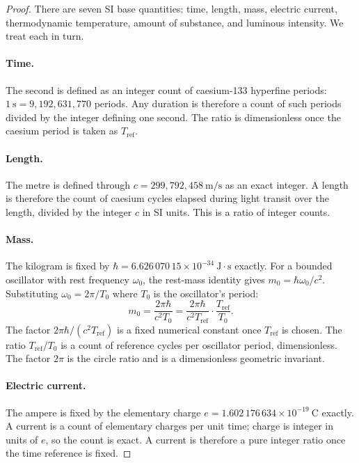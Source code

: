\begin{proof}
There are seven SI base quantities: time, length, mass, electric current,
thermodynamic temperature, amount of substance, and luminous intensity.
We treat each in turn.

\paragraph{Time.}
The second is defined as an integer count of caesium-133 hyperfine periods:
$1~\mathrm{s} = 9{,}192{,}631{,}770$ periods.
Any duration is therefore a count of such periods divided by the integer
defining one second.
The ratio is dimensionless once the caesium period is taken as $T_{\mathrm{ref}}$.

\paragraph{Length.}
The metre is defined through $c = 299{,}792{,}458~\mathrm{m/s}$ as an exact integer.
A length is therefore the count of caesium cycles elapsed during light
transit over the length, divided by the integer $c$ in SI units.
This is a ratio of integer counts.

\paragraph{Mass.}
The kilogram is fixed by $\hbar = 6.626\,070\,15\times10^{-34}~\mathrm{J\cdot s}$
exactly.
For a bounded oscillator with rest frequency $\omega_{0}$,
the rest-mass identity gives $m_{0} = \hbar\omega_{0}/c^{2}$.
Substituting $\omega_{0} = 2\pi/T_{0}$ where $T_{0}$ is the oscillator's period:
\begin{equation}
  m_{0} = \frac{2\pi\hbar}{c^{2}T_{0}}
        = \frac{2\pi\hbar}{c^{2}T_{\mathrm{ref}}} \cdot \frac{T_{\mathrm{ref}}}{T_{0}}.
\end{equation}
The factor $2\pi\hbar/(c^{2}T_{\mathrm{ref}})$ is a fixed numerical constant once
$T_{\mathrm{ref}}$ is chosen.
The ratio $T_{\mathrm{ref}}/T_{0}$ is a count of reference cycles per oscillator
period, dimensionless.
The factor $2\pi$ is the circle ratio and is a dimensionless geometric invariant.

\paragraph{Electric current.}
The ampere is fixed by the elementary charge $e = 1.602\,176\,634\times10^{-19}~\mathrm{C}$
exactly.
A current is a count of elementary charges per unit time; charge is integer
in units of $e$, so the count is exact.
A current is therefore a pure integer ratio once the time reference is fixed.


\end{proof}
